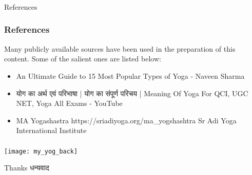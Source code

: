 \begin{frame}[fragile]\frametitle{}
\begin{center}
{\Large References}
\end{center}
\end{frame}


\begin{frame}[fragile]\frametitle{References}

Many publicly available sources have been used in the preparation of this content. Some of the salient ones are listed below:

	\begin{itemize}
	\item An Ultimate Guide to 15 Most Popular Types of Yoga - Naveen Sharma
	\item योग का अर्थ एवं परिभाषा | योग का संपूर्ण परिचय | Meaning Of Yoga For QCI, UGC NET, Yoga All Exams - YouTube
	\item MA Yogashastra https://sriadiyoga.org/ma_yogshashtra Sr Adi Yoga International Institute
	\end{itemize}

\end{frame}


\begin{frame}[fragile]\frametitle{}

\begin{center}
\texttt{[image: my\_yog\_back]}

Thanks धन्यवाद
\end{center}

\end{frame}
